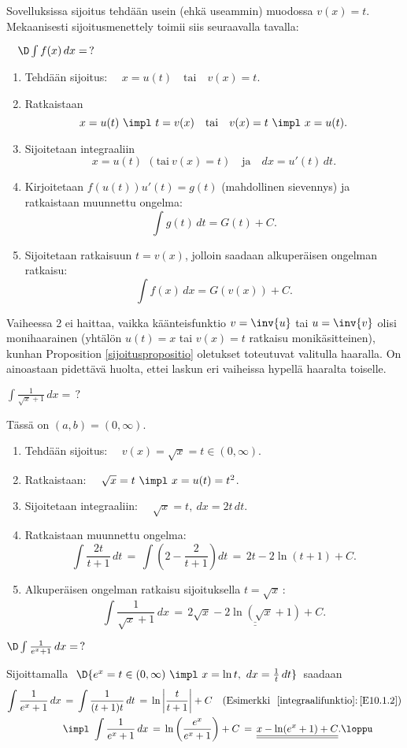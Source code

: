 Sovelluksissa sijoitus tehdään usein (ehkä useammin) muodossa $v(x)=t$. Mekaanisesti
sijoitusmenettely toimii siis seuraavalla tavalla:

 $\quad \D\int f(x)\,dx=\,?$
\begin{enumerate}
\item Tehdään sijoitus: $\quad x=u(t) \quad \text{tai} \quad v(x)=t$.
\item Ratkaistaan
      \[
      x=u(t)\ \impl\ t=v(x) \quad \text{tai} \quad v(x)=t \ \impl \ x=u(t).
      \]
\item Sijoitetaan integraaliin
      \[
      x=u(t)\,\ (\text{tai}\ v(x)=t) \quad \text{ja} \quad dx=u'(t)\,dt.
      \]
\item Kirjoitetaan $f(u(t))u'(t)=g(t)$ (mahdollinen sievennys) ja ratkaistaan muunnettu
      ongelma:
      \[
      \int g(t)\,dt = G(t)+C.
      \]
\item Sijoitetaan ratkaisuun $t=v(x)$, jolloin saadaan alkuperäisen ongelman ratkaisu:
      \[
      \int f(x)\, dx=G(v(x))+C.
      \]
\end{enumerate}
Vaiheessa 2 ei haittaa, vaikka käänteisfunktio $v=\inv{u}$ tai $u=\inv{v}$ olisi monihaarainen
(yhtälön $u(t)=x$ tai $v(x)=t$ ratkaisu monikäsitteinen), kunhan Proposition
\ref{sijoituspropositio} oletukset toteutuvat valitulla haaralla. On ainoastaan pidettävä
huolta, ettei laskun eri vaiheissa hypellä haaralta toiselle.
\begin{Exa} $\displaystyle{\int \frac{1}{\sqrt{x}+1}\, dx=\,?}$ 
\end{Exa}
\ratk Tässä on $(a,b) = (0,\infty)$.
\begin{enumerate}
\item Tehdään sijoitus: $\quad v(x) = \sqrt{x} = t \in (0,\infty)$.
\item Ratkaistaan: $\quad \sqrt{x}=t\ \impl\ x=u(t)=t^2$.
\item Sijoitetaan integraaliin: $\quad \sqrt{x}=t,\ dx=2t\,dt$.
\item Ratkaistaan muunnettu ongelma:
\[
\int \frac{2t}{t+1}\,dt \,=\, \int \left(2-\frac{2}{t+1}\right)dt \,=\, 2t - 2\ln(t+1) + C.
\]
\item Alkuperäisen ongelman ratkaisu sijoituksella $t=\sqrt{x}\,$:
\[
\int \frac{1}{\sqrt{x}+1}\,dx \,=\, \underline{\underline{2\sqrt{x} - 2\ln(\sqrt{x}+1) + C}}.
\]
\end{enumerate}
\begin{Exa} \label{rat-palautuva integraali 1}
$\D\int\frac{1}{e^x+1}\, dx=\,?$
\end{Exa}
\ratk Sijoittamalla $\ \D{e^x=t\in(0,\infty)\ \impl\ x=\ln t,\ dx=\frac{1}{t}\,dt}\,$ saadaan
\begin{align*}
\int\frac{1}{e^x+1}\,dx\,
&=\,\int\frac{1}{(t+1)t}\,dt\,
 =\,\ln\left|\frac{t}{t+1}\right|+C\quad 
               (\text{Esimerkki \ \ref{integraalifunktio}:\,\ref{E10.1.2}}) \\
&\impl \ \int\frac{1}{e^x+1}\,dx\,
 =\,\ln\left(\frac{e^x}{e^x+1}\right)+C\,
 =\,\underline{\underline{x-\ln(e^x+1)+C}}. \loppu
\end{align*}

